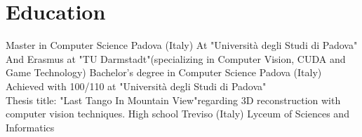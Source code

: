 \documentclass[letterpaper]{twentysecondcv} %
\begin{document}
\section{Education}

\begin{twenty} %
		{Master in Computer Science}	{Padova (Italy)}
		{At "Università degli Studi di Padova"\footnotemarkA[1]\newline
		And Erasmus at "TU Darmstadt"\footnotemarkA[2] (specializing in Computer Vision, CUDA and Game Technology)}
		{Bachelor's degree in Computer Science}	{Padova (Italy)}
		{Achieved with 100/110 at "Università degli Studi di Padova"\footnotemarkA[2]\\
		Thesis title: "Last Tango In Mountain View"\footnotemarkA[3] regarding 3D reconstruction with computer vision techniques.}
		{High school}	{Treviso (Italy)}
		{Lyceum of Sciences and Informatics}
\end{twenty}







\end{document}
